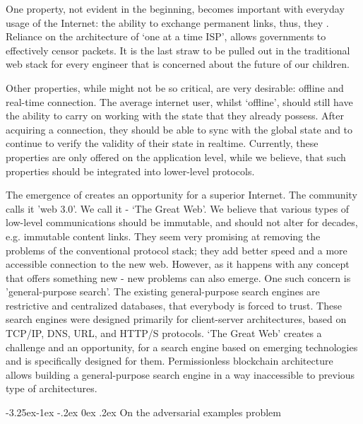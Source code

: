 \documentclass[8pt,oneside]{amsart}
\makeatletter
\newcommand{\linkgreen}[2]{\href{#1}{\color{green}{#2}}}
\renewcommand\subsection{\@startsection{subsection}{2}{\z@}%
                                     {-3.25ex\@plus -1ex \@minus -.2ex}%
                                     {0ex \@plus .2ex}%
                                     {\play\Large}}%
\newcommand{\titleSection}[1]{\subsection{#1}}
\makeatother
\begin{document}
\begin{Abstract}
One property, not evident in the beginning, becomes important with everyday usage of the Internet: the ability to exchange permanent links, thus, they \linkgreen{https://ipfs.io/ipfs/QmNhaUrhM7KcWzFYdBeyskoNyihrpHvUEBQnaddwPZigcN}{would not break, after time had passed}. Reliance on the architecture of ‘one at a time ISP’, allows governments to effectively censor packets. It is the last straw to be pulled out in the traditional web stack for every engineer that is concerned about the future of our children.

Other properties, while might not be so critical, are very desirable: offline and real-time connection. The average internet user, whilst ‘offline’, should still have the ability to carry on working with the state that they already possess. After acquiring a connection, they should be able to sync with the global state and to continue to verify the validity of their state in realtime. Currently, these properties are only offered on the application level, while we believe, that such properties should be integrated into lower-level protocols.

The emergence of \linkgreen{https://ipfs.io/ipfs/Qmf3eHU9idMUZgx6MKhCsFPWL24X9pDUi2ECqyH8UtBAMQ}{a brand-new web-stack} creates an opportunity for a superior Internet. The community calls it 'web 3.0'. We call it - ‘The Great Web’. We believe that various types of low-level communications should be immutable, and should not alter for decades, e.g. immutable content links. They seem very promising at removing the problems of the conventional protocol stack; they add better speed and a more accessible connection to the new web. However, as it happens with any concept that offers something new - new problems can also emerge. One such concern is 'general-purpose search'. The existing general-purpose search engines are restrictive and centralized databases, that everybody is forced to trust. These search engines were designed primarily for client-server architectures, based on TCP/IP, DNS, URL, and HTTP/S protocols. ‘The Great Web’ creates a challenge and an opportunity, for a search engine based on emerging technologies and is specifically designed for them. Permissionless blockchain architecture allows building a general-purpose search engine in a way inaccessible to previous type of architectures.

\titleSection{On the adversarial examples problem}\label{On the adversarial examples problem}


\end{Abstract}
\end{document}
